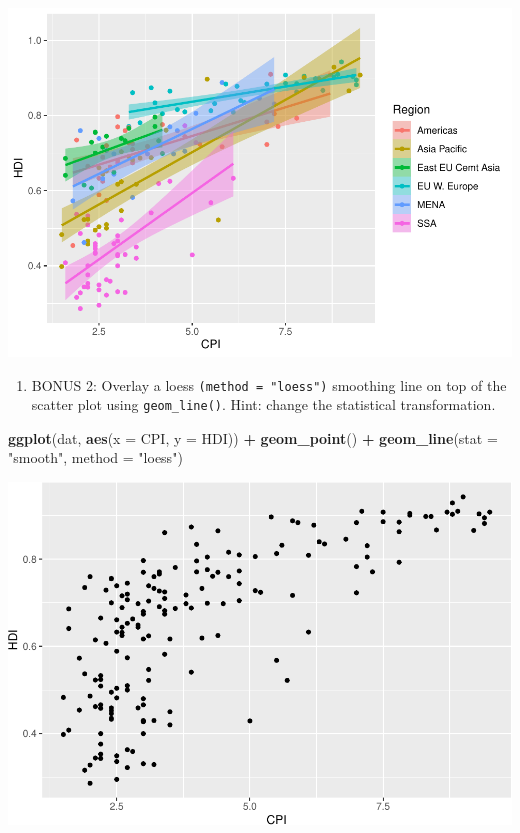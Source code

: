 \documentclass[
]{book}
\newenvironment{Shaded}{\begin{snugshade}}{\end{snugshade}}
\newcommand{\DataTypeTok}[1]{\textcolor[rgb]{0.13,0.29,0.53}{#1}}
\newcommand{\KeywordTok}[1]{\textcolor[rgb]{0.13,0.29,0.53}{\textbf{#1}}}
\newcommand{\NormalTok}[1]{#1}
\newcommand{\OperatorTok}[1]{\textcolor[rgb]{0.81,0.36,0.00}{\textbf{#1}}}
\newcommand{\StringTok}[1]{\textcolor[rgb]{0.31,0.60,0.02}{#1}}
\providecommand{\tightlist}{%
  \setlength{\itemsep}{0pt}\setlength{\parskip}{0pt}}
\begin{document}
\begin{alert}
\includegraphics{R/Rgraphics/figures/unnamed-chunk-193-1.pdf}

\begin{enumerate}
\def\labelenumi{\arabic{enumi}.}
\setcounter{enumi}{5}
\tightlist
\item
  BONUS 2: Overlay a loess \texttt{(method\ =\ "loess")} smoothing line on top of the scatter plot using \texttt{geom\_line()}. Hint: change the statistical transformation.
\end{enumerate}

\begin{Shaded}
\begin{Highlighting}[]
\KeywordTok{ggplot}\NormalTok{(dat, }\KeywordTok{aes}\NormalTok{(}\DataTypeTok{x =}\NormalTok{ CPI, }\DataTypeTok{y =}\NormalTok{ HDI)) }\OperatorTok{+}
\StringTok{  }\KeywordTok{geom\_point}\NormalTok{() }\OperatorTok{+}
\StringTok{  }\KeywordTok{geom\_line}\NormalTok{(}\DataTypeTok{stat =} \StringTok{"smooth"}\NormalTok{, }\DataTypeTok{method =} \StringTok{"loess"}\NormalTok{)}
\end{Highlighting}
\end{Shaded}

\includegraphics{R/Rgraphics/figures/unnamed-chunk-194-1.pdf}

\end{alert}
\end{document}
